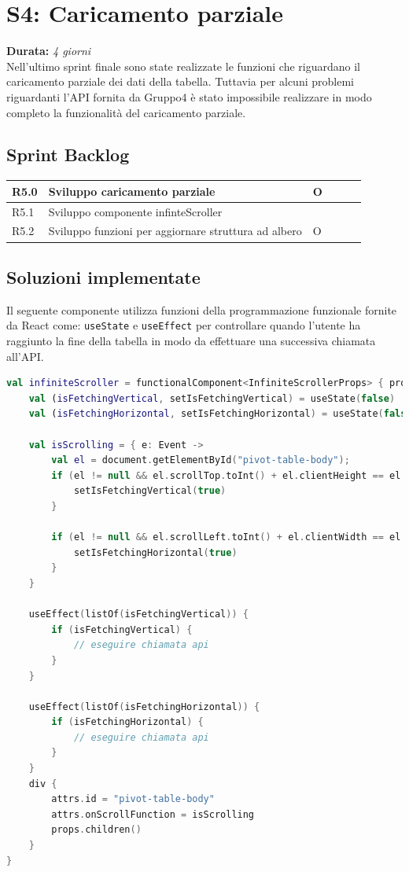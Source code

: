 \newpage

\section{S4: Caricamento parziale}
\textbf{Durata:} \textit{4 giorni} \\
Nell'ultimo sprint finale sono state realizzate le funzioni che riguardano il caricamento parziale dei dati della tabella. Tuttavia per alcuni problemi riguardanti l'API fornita da Gruppo4 è stato impossibile realizzare in modo completo la funzionalità del caricamento parziale.

\subsection{Sprint Backlog}
\begin{longtable} {
		|>{}p{10mm}| 
		|>{}p{90mm}|
		|>{}p{15mm}|
		|>{}p{15mm}|
		|>{}p{15mm}|
		>{}p{0mm}}
	\hline
	R5.0 & \textbf{Sviluppo caricamento parziale}  & O  \\ \hline
	R5.1   & Sviluppo componente infinteScroller &      \\ \hline
	R5.2   & Sviluppo funzioni per aggiornare struttura ad albero & O     \\ \hline
\end{longtable}

\subsection{Soluzioni implementate}
Il seguente componente utilizza funzioni della programmazione funzionale fornite da React come: \verb|useState| e \verb|useEffect| per controllare quando l'utente ha raggiunto la fine della tabella in modo da effettuare una successiva chiamata all'API.

\begin{lstlisting}[caption={Funzione parseJSON()}, label={lst:bodycells}, language=Kotlin]
val infiniteScroller = functionalComponent<InfiniteScrollerProps> { props ->
	val (isFetchingVertical, setIsFetchingVertical) = useState(false)
	val (isFetchingHorizontal, setIsFetchingHorizontal) = useState(false)
	
	val isScrolling = { e: Event ->
		val el = document.getElementById("pivot-table-body");
		if (el != null && el.scrollTop.toInt() + el.clientHeight == el.scrollHeight) {
			setIsFetchingVertical(true)
		}
		
		if (el != null && el.scrollLeft.toInt() + el.clientWidth == el.scrollWidth) {
			setIsFetchingHorizontal(true)
		}
	}
	
	useEffect(listOf(isFetchingVertical)) {
		if (isFetchingVertical) {
			// eseguire chiamata api
		}
	}
	
	useEffect(listOf(isFetchingHorizontal)) {
		if (isFetchingHorizontal) {
			// eseguire chiamata api
		}
	}
	div {
		attrs.id = "pivot-table-body"
		attrs.onScrollFunction = isScrolling
		props.children()
	}
}
\end{lstlisting}

